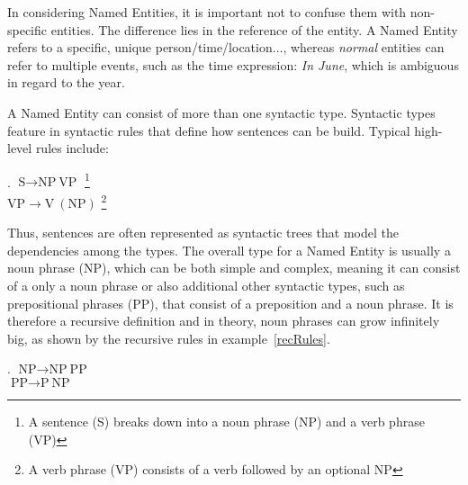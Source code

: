 \documentclass[11pt]{article}
\newcommand{\namedentity}{Named Entity}
\begin{document}
In considering Named Entities, it is important not to confuse them with non-specific entities. %
The difference lies in the reference of the entity. A Named Entity refers to a specific, unique person/time/location..., whereas
\emph{normal} entities can refer to multiple events, such as the time expression: \emph{In June}, which is ambiguous in regard to the year.

A Named Entity can consist of more than one syntactic type. Syntactic types feature in syntactic rules that define how sentences can be build.
Typical high-level rules include:

\ex. $\text{S} \rightarrow \text{NP}\  \text{VP} $ \footnote{ A sentence (S) breaks down into a noun phrase (NP) and a verb phrase (VP)} \\
$ \text{VP} \rightarrow \text{V}\  (\text{NP})$ \footnote{ A verb phrase (VP) consists of a verb followed by an optional NP} 

Thus, sentences are often represented as syntactic trees that model the dependencies among the types.
The overall type for a Named Entity is usually a noun phrase (NP), which can be both simple and complex, meaning it can consist of a only a noun phrase or 
also additional other syntactic types, such as prepositional phrases (PP), that consist of a preposition and a noun phrase. 
It is therefore a recursive definition and in theory, noun phrases can grow infinitely big, as shown by the recursive rules in example~\ref{recRules}.  %

\ex. $ \text{NP} \rightarrow \text{NP} \  \text{PP}$ \\ \label{recRules}
     $ \text{PP} \rightarrow \text{P} \  \text{NP}$ 
 

% 
\end{document}

